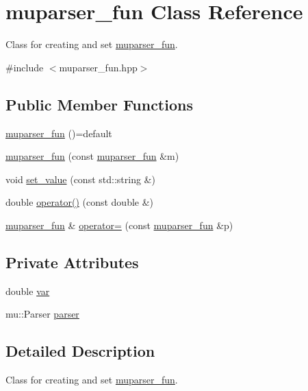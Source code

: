 \hypertarget{classmuparser__fun}{}\section{muparser\+\_\+fun Class Reference}
\label{classmuparser__fun}


Class for creating and set \hyperlink{classmuparser__fun}{muparser\+\_\+fun}.  




{\ttfamily \#include $<$muparser\+\_\+fun.\+hpp$>$}

\subsection*{Public Member Functions}
\begin{DoxyCompactItemize}
\item 
\hyperlink{classmuparser__fun_a17c98796657ea4da75ca6e273f0b6965}{muparser\+\_\+fun} ()=default
\item 
\hyperlink{classmuparser__fun_a106b21c0b17eb9fbc347fd510f617efb}{muparser\+\_\+fun} (const \hyperlink{classmuparser__fun}{muparser\+\_\+fun} \&m)
\item 
void \hyperlink{classmuparser__fun_a1e7855a7285191f81deddf262cac949a}{set\+\_\+value} (const std\+::string \&)
\item 
double \hyperlink{classmuparser__fun_ad6ad244f299a60774735832c4ea28d66}{operator()} (const double \&)
\item 
\hyperlink{classmuparser__fun}{muparser\+\_\+fun} \& \hyperlink{classmuparser__fun_a6e4082f4ba40e947b734195a337823d9}{operator=} (const \hyperlink{classmuparser__fun}{muparser\+\_\+fun} \&p)
\end{DoxyCompactItemize}
\subsection*{Private Attributes}
\begin{DoxyCompactItemize}
\item 
double \hyperlink{classmuparser__fun_ac4fe6d4c1437a4f66039268cdd304b75}{var}
\item 
mu\+::\+Parser \hyperlink{classmuparser__fun_ad94fb029c66d186b6fe278b51df8dfc4}{parser}
\end{DoxyCompactItemize}


\subsection{Detailed Description}
Class for creating and set \hyperlink{classmuparser__fun}{muparser\+\_\+fun}. 

